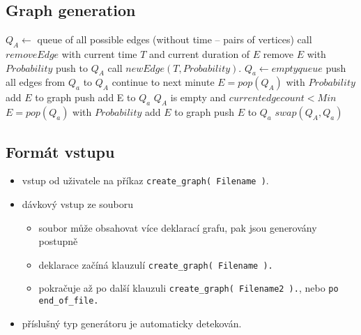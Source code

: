 \documentclass[11pt, a4paper,draft]{article}
\newcommand{\pl}[1]{\texttt{#1}} %
\theoremstyle{plain}
\theoremstyle{definition}
\theoremstyle{remark}
\begin{document}
\subsection{Graph generation}
\label{sec:generator-generation}

\begin{algorithmic}[1]
    \State $Q_A \leftarrow$ queue of all possible edges (without time -- pairs of vertices)
            \State call $removeEdge$ with current time $T$ and current duration of $E$
            \State remove $E$ with $Probability$
             push to $Q_A$ \EndIf
        \EndFor
        \State call $newEdge( T, Probability )$.
        \State $Q_a \leftarrow empty queue$
                \State push all edges from $Q_a$ to $Q_A$
                \State continue to next minute
            \EndIf
            \State $E = pop( Q_A )$
            \State with $Probability$ add $E$ to graph
             push add E to $Q_a$ \EndIf
            \If $Q_A$ is empty and $current edge count < Min$
                    \State $E = pop( Q_a )$
                    \State with $Probability$ add $E$ to graph
                     push $E$ to $Q_a$ \EndIf
                \EndWhile
            \EndIf
        \EndWhile
        \State $swap( Q_A, Q_a )$ 
    \EndFor
\end{algorithmic}

\subsection{Formát vstupu}
\begin{itemize}
    \item vstup od uživatele na příkaz \pl{create\_graph( Filename )}.
    \item dávkový vstup ze souboru
        \begin{itemize}
            \item soubor může obsahovat více deklarací grafu, pak jsou generovány postupně
            \item deklarace začíná klauzulí \pl{create\_graph( Filename ).}
            \item pokračuje až po další klauzuli \pl{create\_graph( Filename2 ).}, nebo
                \pl{po end\_of\_file.}
        \end{itemize}
    \item příslušný typ generátoru je automaticky detekován.
\end{itemize}
\end{document}
